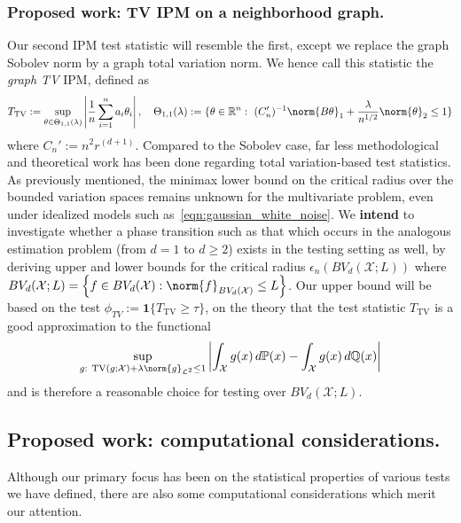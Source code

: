 \documentclass{article}
\newcommand{\Reals}{\mathbb{R}}
\newcommand{\abs}[1]{\left \lvert #1 \right \rvert}
\newcommand{\set}[1]{\left\{#1\right\}}
\newcommand{\1}{\mathbf{1}}
\newcommand{\Pbb}{\mathbb{P}}
\newcommand{\Qbb}{\mathbb{Q}}
\theoremstyle{alden}
\theoremstyle{aldenthm}
\theoremstyle{definition}
\theoremstyle{remark}
\begin{document}
\subsubsection{Proposed work: TV IPM on a neighborhood graph.}
Our second IPM test statistic will resemble the first, except we replace the graph Sobolev norm by a graph total variation norm. We hence call this statistic the \emph{graph TV} IPM, defined as
\begin{equation*}
T_{\mathrm{TV}} := \sup_{\theta \in \Theta_{1,1}(\lambda)} \abs{\frac{1}{n}\sum_{i = 1}^{n} a_i \theta_i}, \quad \Theta_{1,1}(\lambda) := \{\theta \in \Reals^n:~ (C_n')^{-1} \norm{B\theta}_1 + \frac{\lambda}{n^{1/2}}\norm{\theta}_2 \leq 1\}
\end{equation*}
where $C_n' := n^{2}r^{(d + 1)}$. Compared to the Sobolev case, far less methodological and theoretical work has been done regarding total variation-based test statistics. As previously mentioned, the minimax lower bound on the critical radius over the bounded variation spaces remains unknown for the multivariate problem, even under idealized models such as~\eqref{eqn:gaussian_white_noise}.  We \textbf{intend} to investigate whether a phase transition such as that which occurs in the analogous estimation problem (from $d = 1$ to $d \geq 2$) exists in the testing setting as well, by deriving upper and lower bounds for the critical radius $\epsilon_n(BV_d(\mathcal{X};L))$ where $BV_d(\mathcal{X}; L) = \set{f \in BV_d(\mathcal{X}): \norm{f}_{BV_d(\mathcal{X})} \leq L}$. Our upper bound will be based on the test $\phi_{TV} := \1\{T_{\mathrm{TV}} \geq \tau \}$, on the theory that the test statistic $T_{\mathrm{TV}}$ is a good approximation to the functional
\begin{equation*}
\sup_{g:~ \mathrm{TV}(g;\mathcal{X}) + \lambda\norm{g}_{\mathcal{L}^2} \leq 1} \abs{\int_{\mathcal{X}} g(x) \,d\Pbb(x) - \int_{\mathcal{X}} g(x) \,d\Qbb(x)}
\end{equation*}
and is therefore a reasonable choice for testing over $BV_d(\mathcal{X};L)$.

\subsection{Proposed work: computational considerations.}

Although our primary focus has been on the statistical properties of various tests we have defined, there are also some computational considerations which merit our attention.
\end{document}
